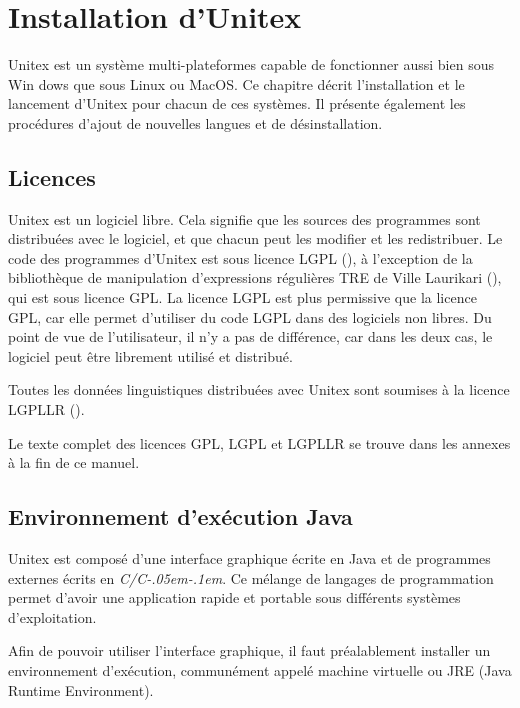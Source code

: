 \chapter{Installation d'Unitex}
\label{chap-install}

Unitex est un système multi-plateformes capable de fonctionner aussi bien sous Win
dows que sous Linux ou MacOS. Ce chapitre décrit l’installation et le lancement d’Unitex
pour chacun de ces systèmes. Il présente également les procédures d’ajout de nouvelles
langues et de désinstallation.

\section{Licences}
\label{section-licences}
Unitex est un logiciel libre. Cela signifie que les sources des programmes sont distribuées avec le
logiciel, et que chacun peut les modifier et les redistribuer. Le code des programmes d’Unitex est
sous licence LGPL (\cite{LGPL}), à l’exception de la bibliothèque de manipulation d’expressions
régulières TRE de Ville Laurikari (\cite{TRE}), qui est sous licence GPL.
La licence LGPL est plus permissive que la licence GPL, car elle permet d’utiliser du code LGPL dans
des logiciels non libres. Du point de vue de l’utilisateur, il n’y a pas de différence, car dans
les deux cas, le logiciel peut être librement utilisé et distribué.


\bigskip
\noindent Toutes les données linguistiques distribuées avec Unitex sont soumises à la licence LGPLLR
 (\cite{LGPLLR}).

\bigskip
\noindent Le texte complet des licences GPL, LGPL et LGPLLR se trouve dans les annexes à la fin de
ce manuel.

\section{Environnement d’exécution Java}
Unitex est composé d’une interface graphique écrite en Java et de programmes externes
écrits en \textit{C/C\kern-.05em\raisebox{.5ex}{++}\kern-.1em}. Ce mélange de langages de 
programmation permet d’avoir une application rapide et portable sous différents systèmes d’exploitation.


\bigskip
\noindent Afin de pouvoir utiliser l’interface graphique, il faut préalablement installer
un environnement d’exécution, communément appelé machine virtuelle  ou
JRE (Java Runtime Environment).


